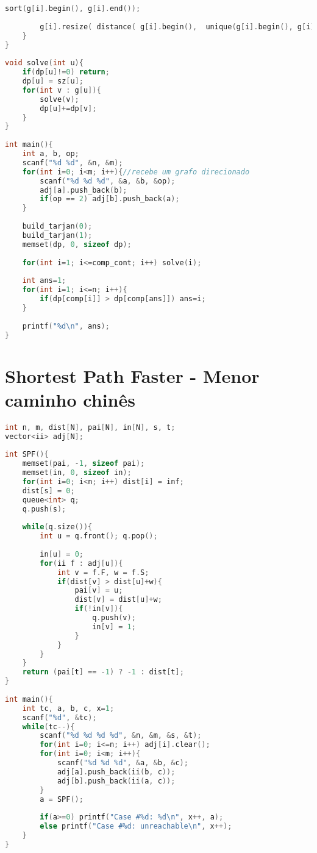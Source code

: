 \documentclass[12pt,a4paper,twoside]{report}
\begin{document}
\begin{lstlisting}[caption=Tarjan - Grafo das Componentes Fortemente Conexas,language=C++]
        sort(g[i].begin(), g[i].end());
         
        g[i].resize( distance( g[i].begin(),  unique(g[i].begin(), g[i].end())  ) );//tira repetições
    }
}
 
void solve(int u){
    if(dp[u]!=0) return;
    dp[u] = sz[u];
    for(int v : g[u]){
        solve(v);
        dp[u]+=dp[v];
    }
}
 
int main(){
    int a, b, op;
    scanf("%d %d", &n, &m);
    for(int i=0; i<m; i++){//recebe um grafo direcionado
        scanf("%d %d %d", &a, &b, &op);
        adj[a].push_back(b);
        if(op == 2) adj[b].push_back(a);
    }
     
    build_tarjan(0);
    build_tarjan(1);
    memset(dp, 0, sizeof dp);
     
    for(int i=1; i<=comp_cont; i++) solve(i);
     
    int ans=1;
    for(int i=1; i<=n; i++){
        if(dp[comp[i]] > dp[comp[ans]]) ans=i;
    }
     
    printf("%d\n", ans);
}
\end{lstlisting}

\section{Shortest Path Faster - Menor caminho chinês}
\noindent\begin{lstlisting}[caption=Shortest Path Faster - Menor caminho chinês,language=C++]
int n, m, dist[N], pai[N], in[N], s, t;
vector<ii> adj[N];
 
int SPF(){
    memset(pai, -1, sizeof pai);
    memset(in, 0, sizeof in);
    for(int i=0; i<n; i++) dist[i] = inf;
    dist[s] = 0;
    queue<int> q;
    q.push(s);
     
    while(q.size()){
        int u = q.front(); q.pop();
         
        in[u] = 0;
        for(ii f : adj[u]){
            int v = f.F, w = f.S;
            if(dist[v] > dist[u]+w){
                pai[v] = u;
                dist[v] = dist[u]+w;
                if(!in[v]){
                    q.push(v);
                    in[v] = 1;
                }
            }
        }
    }
    return (pai[t] == -1) ? -1 : dist[t];
}
 
int main(){
    int tc, a, b, c, x=1;
    scanf("%d", &tc);
    while(tc--){
        scanf("%d %d %d %d", &n, &m, &s, &t);
        for(int i=0; i<=n; i++) adj[i].clear();
        for(int i=0; i<m; i++){
            scanf("%d %d %d", &a, &b, &c);
            adj[a].push_back(ii(b, c));
            adj[b].push_back(ii(a, c));
        }
        a = SPF();
         
        if(a>=0) printf("Case #%d: %d\n", x++, a);
        else printf("Case #%d: unreachable\n", x++);
    }
}
\end{lstlisting}
\end{document}
